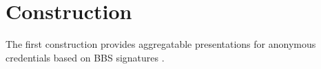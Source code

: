 \section{Construction}
The first construction provides aggregatable presentations for anonymous credentials based on BBS signatures \cite{DBLP:conf/eurocrypt/TessaroZ23a}.




